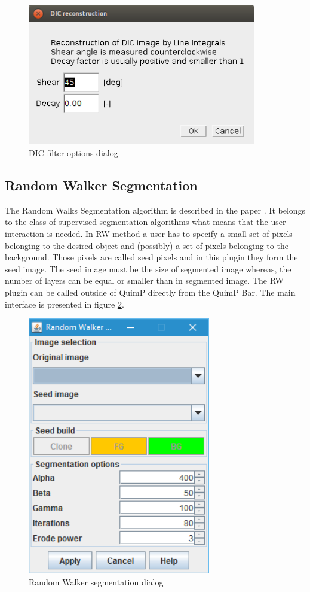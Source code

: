 \documentclass[a4paper,12pt]{article}
\begin{document}
\begin{figure}[ht]
	\centering
	\includegraphics[width=10cm]{DICwindow.png} 
	\caption{DIC filter options dialog}
	\label{fig:dicdialog}
\end{figure} 

\subsection{Random Walker Segmentation}
\label{sec:RWSeg}

The Random Walks Segmentation algorithm is described in the paper \cite{Grady2006}. It belongs to the class of supervised segmentation algorithms what means that the user interaction is needed. In RW method a user has to specify a small set of pixels belonging to the desired object and
(possibly) a set of pixels belonging to the background. Those pixels are called seed pixels and in this plugin they form the seed image. The seed image must be the size of segmented image whereas, the number of layers can be equal or smaller than in segmented image. The RW plugin can be called outside of QuimP directly from the QuimP Bar. The main interface is presented in figure \ref{fig:rwdialog}.

\begin{figure}[ht]
	\centering
	\includegraphics[width=8cm]{screenRandomWalk.png} 
	\caption{Random Walker segmentation dialog}
	\label{fig:rwdialog}
\end{figure}
\end{document}
